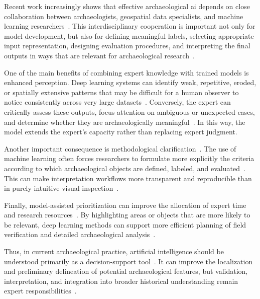 Recent work increasingly shows that effective archaeological \gls{ai} depends on close collaboration between archaeologists, geospatial data specialists, and machine learning researchers~\cite{olivier_implementing_2021,azarkhordad_detecting_2025,fiorucci_deep_2022}. This interdisciplinary cooperation is important not only for model development, but also for defining meaningful labels, selecting appropriate input representation, designing evaluation procedures, and interpreting the final outputs in ways that are relevant for archaeological research~\cite{olivier_implementing_2021}.

One of the main benefits of combining expert knowledge with trained models is enhanced perception. Deep learning systems can identify weak, repetitive, eroded, or spatially extensive patterns that may be difficult for a human observer to notice consistently across very large datasets~\cite{cowley_what_2016,azarkhordad_detecting_2025}. Conversely, the expert can critically assess these outputs, focus attention on ambiguous or unexpected cases, and determine whether they are archaeologically meaningful~\cite{fylaktos_deep_2025,bundzel_semantic_2020}. In this way, the model extends the expert's capacity rather than replacing expert judgment.

Another important consequence is methodological clarification~\cite{trier_using_2019,cowley_what_2016}. The use of machine learning often forces researchers to formulate more explicitly the criteria according to which archaeological objects are defined, labeled, and evaluated~\cite{trier_using_2019,bundzel_semantic_2020,azarkhordad_detecting_2025}. This can make interpretation workflows more transparent and reproducible than in purely intuitive visual inspection~\cite{kokalj_standardizing_2025,azarkhordad_detecting_2025,Castilla2008}.

Finally, model-assisted prioritization can improve the allocation of expert time and research resources~\cite{azarkhordad_detecting_2025,blaschke_object_2010,verschoof-van_der_vaart_combining_2020}. By highlighting areas or objects that are more likely to be relevant, deep learning methods can support more efficient planning of field verification and detailed archaeological analysis~\cite{fylaktos_deep_2025,zhang_unveiling_2024}.

Thus, in current archaeological practice, artificial intelligence should be understood primarily as a decision-support tool~\cite{azarkhordad_detecting_2025,bundzel_semantic_2020,fylaktos_deep_2025,zanzotto_viewpoint_2019,olivier_implementing_2021,shim_past_2002}. It can improve the localization and preliminary delineation of potential archaeological features, but validation, interpretation, and integration into broader historical understanding remain expert responsibilities~\cite{verschoof-van_der_vaart_combining_2020,guyot_objective_2021,azarkhordad_detecting_2025}.
